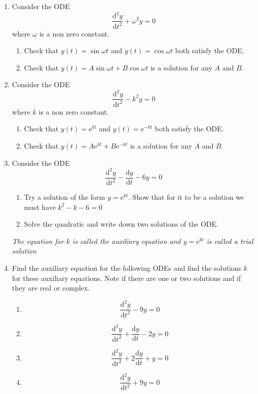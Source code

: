 \documentclass[11pt,a4paper]{article}
\newcommand{\diff}{\mathrm{d}}
\begin{document}
\begin{enumerate}
\item Consider the ODE
$$  \frac{\diff^2y}{\diff t^2}  + \omega^2 y = 0 $$
where $\omega$ is a non zero constant.
\begin{enumerate}
\item Check that $y(t) = \sin \omega t$ and  $y(t) = \cos \omega t$ both satisfy the ODE.
\item Check that $y(t) = A \sin \omega t + B \cos \omega t$ is a solution for any $A$ and $B$.
\end{enumerate}

\item Consider the ODE
$$  \frac{\diff^2 y}{\diff t^2}  - k^2 y = 0 $$
where $k$ is a non zero constant.
\begin{enumerate}
\item Check that $y(t) = \mathrm{e}^{kt}$ and  $y(t) = \mathrm{e}^{-kt}$ both satisfy the ODE.
\item Check that $y(t) =A\mathrm{e}^{kt} + B\mathrm{e}^{-kt}$ is a solution for any $A$ and $B$.
\end{enumerate}


\item Consider the ODE
$$  \frac{\diff^2 y}{\diff t^2}  - \frac{\diff y}{\diff t} -6 y = 0 $$ 
\begin{enumerate}
\item Try a solution of the form $y=\mathrm{e}^{kt}$. Show that for it to be a solution we must have $k^2 -k -6=0$
\item Solve the quadratic and write down two solutions of the ODE.
\end{enumerate}

{\em The equation for $k$ is called the auxiliary equation and  $y=\mathrm{e}^{kt}$ is called a trial solution}

\item  Find the auxiliary equation for the following ODEs and find the solutions $k$ for these auxiliary equations. Note if there are one or two solutions and if they are real or complex.
\begin{enumerate}
\item $$  \frac{\diff^2 y}{\diff t^2}  -9 y = 0 $$ 
\item $$  \frac{\diff^2 y}{\diff t^2}+  \frac{\diff y}{\diff t} -2 y = 0 $$ 
\item $$  \frac{\diff^2 y}{\diff t^2}+  2\frac{\diff y}{\diff t} + y = 0 $$ 
\item $$  \frac{\diff^2 y}{\diff t^2}  +9 y = 0 $$ 
\end{enumerate}


\end{enumerate}
\end{document}
